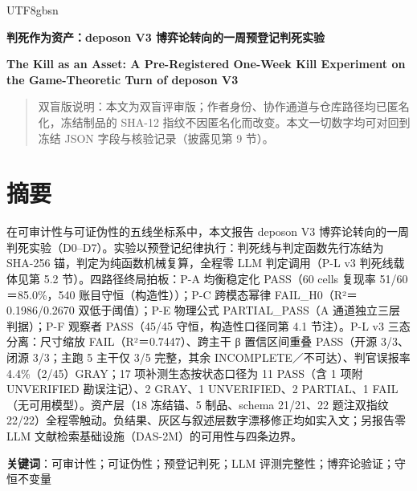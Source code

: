 \documentclass[10pt,a4paper]{article}
\begin{document}
\begin{CJK}{UTF8}{gbsn}
{\centering
{\LARGE\bfseries 判死作为资产：deposon V3 博弈论转向的一周预登记判死实验\par}
\vspace{0.8em}
{\large\bfseries The Kill as an Asset: A Pre-Registered One-Week Kill Experiment on the Game-Theoretic Turn of deposon V3\par}
\vspace{0.2em}
}\par
\vspace{0.3em}
\begin{quote}\small 双盲版说明：本文为双盲评审版；作者身份、协作通道与仓库路径均已匿名化，冻结制品的 SHA-12 指纹不因匿名化而改变。本文一切数字均可对回到冻结 JSON 字段与核验记录（披露见第 9 节）。\end{quote}
\vspace{0.2em}

\section*{摘要}在可审计性与可证伪性的五线坐标系中，本文报告 deposon V3 博弈论转向的一周判死实验（D0–D7）。实验以预登记纪律执行：判死线与判定函数先行冻结为 SHA-256 锚，判定为纯函数机械复算，全程零 LLM 判定调用（P-L v3 判死线载体见第 5.2 节）。四路径终局拍板：P-A 均衡稳定化 PASS（60 cells 复现率 51/60＝85.0\%，540 账目守恒（构造性））；P-C 跨模态幂律 FAIL\_H0（R²＝0.1986/0.2670 双低于阈值）；P-E 物理公式 PARTIAL\_PASS（A 通道独立三层判据）；P-F 观察者 PASS（45/45 守恒，构造性口径同第 4.1 节注）。P-L v3 三态分离：尺寸缩放 FAIL（R²＝0.7447）、跨主干 β 置信区间重叠 PASS（开源 3/3、闭源 3/3；主跑 5 主干仅 3/5 完整，其余 INCOMPLETE／不可达）、判官误报率 4.4\%（2/45）GRAY；17 项补测生态按状态口径为 11 PASS（含 1 项附 UNVERIFIED 勘误注记）、2 GRAY、1 UNVERIFIED、2 PARTIAL、1 FAIL（无可用模型）。资产层（18 冻结锚、5 制品、schema 21/21、22 题注双指纹 22/22）全程零触动。负结果、灰区与叙述层数字漂移修正均如实入文；另报告零 LLM 文献检索基础设施（DAS-2M）的可用性与四条边界。

\noindent \textbf{关键词}：可审计性；可证伪性；预登记判死；LLM 评测完整性；博弈论验证；守恒不变量



\end{CJK}
\end{document}
